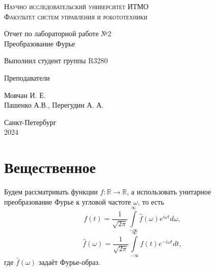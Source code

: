 \documentclass[a4paper,hidelinks,14pt]{extarticle}
\begin{document}
	\begin{titlepage}
		\setlength{\parindent}{0ex}
		
		\begin{center}
			\textsc{
				\vspace{1ex}
				Научно исследовательский университет ИТМО \\
				\vspace{0.5ex}
				Факультет систем управления и робототехники \\
				\vspace{0.5ex}
			}
		\end{center}
		
		\vspace{50mm}
		
		\begin{center}
			Отчет по лабораторной работе №2 \\
			Преобразование Фурье
		\end{center}
		
		\vspace{50mm}
		
		\begin{minipage}{.55\linewidth}
			Выполнил студент группы R3280
			
			Преподаватели
		\end{minipage}
		\hfill
		\begin{minipage}{.5\linewidth}
			\begin{flushright}
				Мовчан И. Е.
				\\
				Пашенко А.В., Перегудин А. А.
			\end{flushright}
		\end{minipage}
		
		\vfill
		\begin{center}
			Санкт-Петербург
			\\
			2024
		\end{center}
		
	\end{titlepage}
	
	\section{Вещественное}
	Будем рассматривать функции $f:\mathbb{R}\rightarrow\mathbb{R}$, а использовать унитарное преобразование Фурье к угловой частоте $\omega$, то есть
	$$
	f(t) = \frac{1}{\sqrt{2\pi}}\int\limits_{-\infty}^{\infty}\hat{f}(\omega) e^{i\omega t} d\omega,
	$$
	$$
	\hat{f}(\omega) = \frac{1}{\sqrt{2\pi}}\int\limits_{-\infty}^{\infty}f(t) e^{-i\omega t} dt,
	$$
	где $\hat{f}(\omega)$ задаёт Фурье-образ.
	
\end{document}
